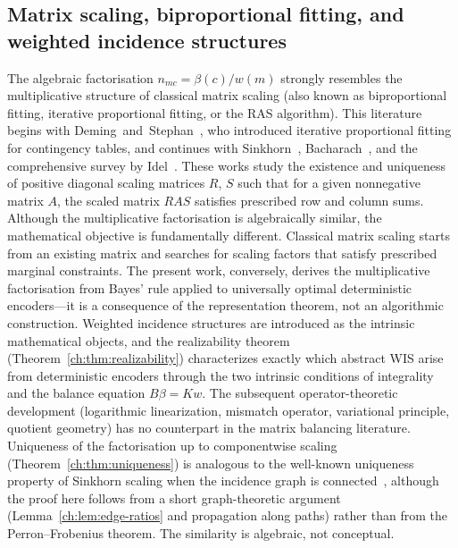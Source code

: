 \subsection*{Matrix scaling, biproportional fitting, and weighted incidence structures}\label{ch:sec:matrix-scaling-biproportional-fitting-and-weighted-inci}
The algebraic factorisation $n_{mc}=\beta(c)/w(m)$ strongly resembles
the multiplicative structure of classical matrix scaling (also known
as biproportional fitting, iterative proportional fitting, or the
RAS algorithm).  This literature begins with
Deming~and~Stephan~\cite{deming1940least}, who introduced iterative
proportional fitting for contingency tables, and continues with
Sinkhorn~\cite{sinkhorn1964relationship,sinkhorn1967concerning},
Bacharach~\cite{bacharach1970biproportional}, and the comprehensive
survey by Idel~\cite{idel2016review}.  These works study the existence
and uniqueness of positive diagonal scaling matrices $R$, $S$ such
that for a given nonnegative matrix $A$, the scaled matrix
$RAS$ satisfies prescribed row and column sums.
Although the multiplicative factorisation is algebraically similar,
the mathematical objective is fundamentally different.  Classical
matrix scaling starts from an existing matrix and searches for scaling
factors that satisfy prescribed marginal constraints.  The present
work, conversely, derives the multiplicative factorisation from Bayes'
rule applied to universally optimal deterministic encoders---it is a
consequence of the representation theorem, not an algorithmic
construction.  Weighted incidence structures are introduced as the
intrinsic mathematical objects, and the realizability theorem
(Theorem~\ref{ch:thm:realizability}) characterizes exactly which abstract
WIS arise from deterministic encoders through the two intrinsic
conditions of integrality and the balance equation $B\beta=Kw$.  The
subsequent operator-theoretic development (logarithmic linearization,
mismatch operator, variational principle, quotient geometry) has no
counterpart in the matrix balancing literature.
Uniqueness of the factorisation up to componentwise scaling
(Theorem~\ref{ch:thm:uniqueness}) is analogous to the well-known
uniqueness property of Sinkhorn scaling when the incidence graph is
connected~\cite{sinkhorn1964relationship}, although the proof here
follows from a short graph-theoretic argument (Lemma~\ref{ch:lem:edge-ratios}
and propagation along paths) rather than from the Perron--Frobenius
theorem.  The similarity is algebraic, not conceptual.

